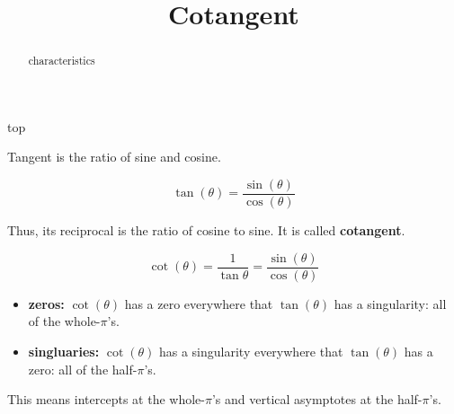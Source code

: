 \documentclass{ximera}
\title{Cotangent}
\begin{document}
\begin{abstract}
characteristics
\end{abstract}
\maketitle




top






Tangent is the ratio of sine and cosine. 

\[   \tan(\theta)  =  \frac{\sin(\theta)}{\cos(\theta)}  \]

Thus, its reciprocal is the ratio of cosine to sine.  It is called \textbf{cotangent}.


\[   \cot(\theta)  =  \frac{1}{\tan{\theta}}  =   \frac{\sin(\theta)}{\cos(\theta)}  \]




\begin{itemize}
\item \textbf{zeros:} $\cot(\theta)$ has a zero everywhere that $\tan(\theta)$ has a singularity:  all of the whole-$\pi$'s.
\item \textbf{singluaries:} $\cot(\theta)$ has a singularity everywhere that $\tan(\theta)$ has a zero:  all of the half-$\pi$'s.
\end{itemize}

This means intercepts at the whole-$\pi$'s and vertical asymptotes at the half-$\pi$'s.
\end{document}
